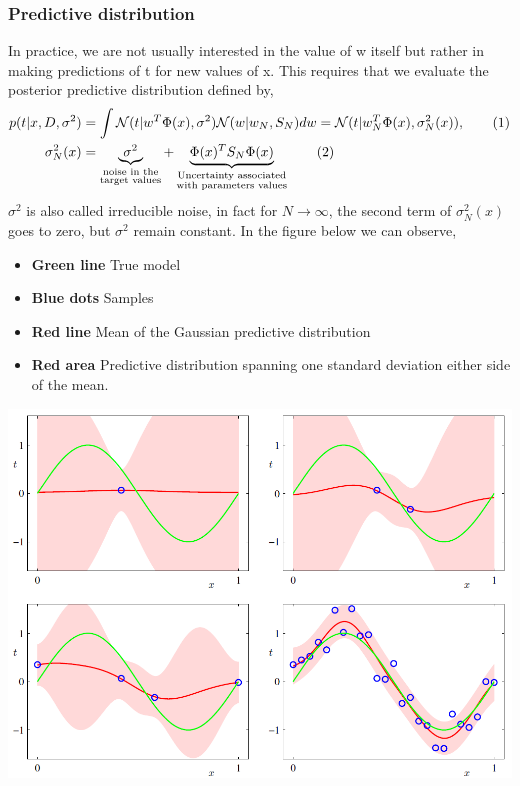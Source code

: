 \documentclass[main.tex]{subfiles}
\newcommand\numberthis{\addtocounter{equation}{1}\tag{\theequation}}
\begin{document}
\newpage
\subsubsection{Predictive distribution}
In practice, we are not usually interested in the value of w itself but rather in
making predictions of t for new values of x. This requires that we evaluate the posterior predictive distribution defined by,
\begin{align*}
    p(t|x,D,\sigma^2) &= \int \mathcal{N}(t|w^T\Phi(x),\sigma^2) \mathcal{N}(w|w_N, S_N)dw = \mathcal{N}(t|w_N^T\Phi(x), \sigma_N^2(x)), \numberthis \\
    \sigma_N^2(x) &= \underbrace{\sigma^2}_{\substack{\text{noise in the} \\ \text{target values}}} + \underbrace{\Phi(x)^T S_N \Phi(x)}_{\substack{\text{Uncertainty associated} \\ \text{with parameters values}}} \numberthis
\end{align*}
$\sigma^2$ is also called irreducible noise, in fact for $N \rightarrow \infty$, the second term of $\sigma_N^2(x)$ goes to zero, but $\sigma^2$ remain constant.
In the figure below we can observe,
\begin{itemize}
    \item \textbf{Green line} True model
    \item \textbf{Blue dots} Samples
    \item \textbf{Red line} Mean of the Gaussian predictive distribution
    \item \textbf{Red area} Predictive distribution spanning one standard deviation either side of the mean.
\end{itemize}

\begin{center}
    \includegraphics[scale=0.6]{img/Posterior_predictive_distribution.PNG}
\end{center}
\end{document}
